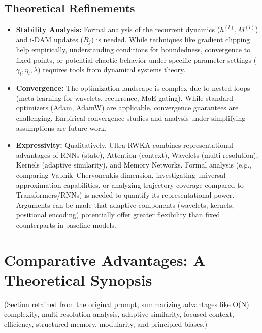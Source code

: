 \documentclass{article}
\begin{document}
\subsection{Theoretical Refinements}
\begin{itemize}
    \item \textbf{Stability Analysis:} Formal analysis of the recurrent dynamics ($h^{(l)}, M^{(l)}$) and i-DAM updates ($B_j$) is needed. While techniques like gradient clipping help empirically, understanding conditions for boundedness, convergence to fixed points, or potential chaotic behavior under specific parameter settings ($\gamma_l, \eta_l, \lambda$) requires tools from dynamical systems theory.
    \item \textbf{Convergence:} The optimization landscape is complex due to nested loops (meta-learning for wavelets, recurrence, MoE gating). While standard optimizers (Adam, AdamW) are applicable, convergence guarantees are challenging. Empirical convergence studies and analysis under simplifying assumptions are future work.
    \item \textbf{Expressivity:} Qualitatively, Ultra-RWKA combines representational advantages of RNNs (state), Attention (context), Wavelets (multi-resolution), Kernels (adaptive similarity), and Memory Networks. Formal analysis (e.g., comparing Vapnik–Chervonenkis dimension, investigating universal approximation capabilities, or analyzing trajectory coverage compared to Transformers/RNNs) is needed to quantify its representational power. Arguments can be made that adaptive components (wavelets, kernels, positional encoding) potentially offer greater flexibility than fixed counterparts in baseline models.
\end{itemize}

\section{Comparative Advantages: A Theoretical Synopsis}
(Section retained from the original prompt, summarizing advantages like O(N) complexity, multi-resolution analysis, adaptive similarity, focused context, efficiency, structured memory, modularity, and principled biases.)
\end{document}
